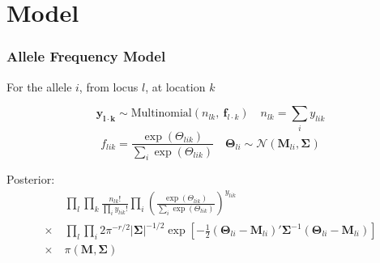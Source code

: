 \documentclass{beamer}
\begin{document}

\section{Model}

\begin{frame}
\frametitle{Allele Frequency Model}

For the allele $i$, from locus $l$, at location $k$


\[ \bm{y_{l \cdot k}} \sim \text{Multinomial}\left(n_{lk},\: \bm{f}_{l \cdot k}\right) \quad n_{lk}=\textstyle\sum_i y_{lik}\]
\[ f_{lik} = \frac{\exp(\Theta_{lik})}{\sum_i \exp(\Theta_{lik})} \quad
\bm{\Theta}_{li} \sim \mathcal{N}( \bm{M}_{li}, \bm{\Sigma_{}})
\]

\pause

Posterior:
\begin{align*}
       &~\prod_l \prod_k \frac{n_{lk}!}{\prod_i y_{lik}!} \textstyle\prod_i \left( \frac{\exp(\Theta_{lik})}{\sum_i \exp(\Theta_{lik})} \right)^{y_{lik}} \\
\times &~\prod_l \prod_i 2\pi^{-r/2} |\bm\Sigma|^{-1/2} \exp\left[ -\frac{1}{2}(\bm{\Theta}_{li} - \bm{M}_{li})'\bm\Sigma^{-1} (\bm{\Theta}_{li} - \bm{M}_{li}) \right]\\
\times &~\pi(\bm{M}, \bm{\Sigma})
\end{align*}

\end{frame}

\end{document}
